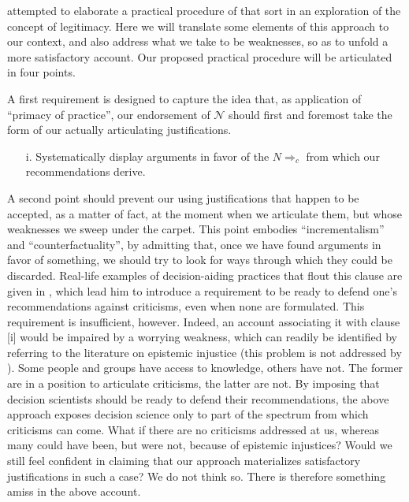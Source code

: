 \documentclass[preprint, french, english, 11pt, authoryear]{elsarticle}%
\newcommand{\adv}{\mathscr{N}}
\begin{document}
\citet{meinard_what_2017} attempted to elaborate a practical procedure of that sort in an exploration of the concept of legitimacy. Here we will translate some elements of this approach to our context, and also address what we take to be weaknesses, so as to unfold a more satisfactory account. Our proposed practical procedure will be articulated in four points.

A first requirement is designed to capture the idea that, as application of “primacy of practice”, our endorsement of $\adv$ should first and foremost take the form of our actually articulating justifications.

\begin{itemize}
\item[i.]	Systematically display arguments in favor of the $N⇒_c$ from which our recommendations derive.
\end{itemize}

A second point should prevent our using justifications that happen to be accepted, as a matter of fact, at the moment when we articulate them, but whose weaknesses we sweep under the carpet. This point embodies “incrementalism” and ``counterfactuality'', by admitting that, once we have found arguments in favor of something, we should try to look for ways through which they could be discarded. Real-life examples of decision-aiding practices that flout this clause are given in \cite{meinard_what_2017}, which lead him to introduce a requirement to be ready to defend one's recommendations against criticisms, even when none are formulated. This requirement is insufficient, however. Indeed, an account associating it with clause [i] would be impaired by a worrying weakness, which can readily be identified by referring to the literature on epistemic injustice \citep{fricker_epistemic_2007} (this problem is not addressed by \cite{meinard_what_2017}). Some people and groups have access to knowledge, others have not. The former are in a position to articulate criticisms, the latter are not. By imposing that decision scientists should be ready to defend their recommendations, the above approach exposes decision science only to part of the spectrum from which criticisms can come. What if there are no criticisms addressed at us, whereas many could have been, but were not, because of epistemic injustices? Would we still feel confident in claiming that our approach materializes satisfactory justifications in such a case? We do not think so. There is therefore something amiss in the above account.
\end{document}
